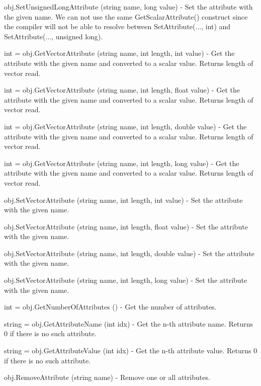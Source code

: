 \begin{DoxyItemize}
\item {\ttfamily obj.\-Set\-Unsigned\-Long\-Attribute (string name, long value)} -\/ Set the attribute with the given name. We can not use the same Get\-Scalar\-Attribute() construct since the compiler will not be able to resolve between Set\-Attribute(..., int) and Set\-Attribute(..., unsigned long).  
\item {\ttfamily int = obj.\-Get\-Vector\-Attribute (string name, int length, int value)} -\/ Get the attribute with the given name and converted to a scalar value. Returns length of vector read.  
\item {\ttfamily int = obj.\-Get\-Vector\-Attribute (string name, int length, float value)} -\/ Get the attribute with the given name and converted to a scalar value. Returns length of vector read.  
\item {\ttfamily int = obj.\-Get\-Vector\-Attribute (string name, int length, double value)} -\/ Get the attribute with the given name and converted to a scalar value. Returns length of vector read.  
\item {\ttfamily int = obj.\-Get\-Vector\-Attribute (string name, int length, long value)} -\/ Get the attribute with the given name and converted to a scalar value. Returns length of vector read.  
\item {\ttfamily obj.\-Set\-Vector\-Attribute (string name, int length, int value)} -\/ Set the attribute with the given name.  
\item {\ttfamily obj.\-Set\-Vector\-Attribute (string name, int length, float value)} -\/ Set the attribute with the given name.  
\item {\ttfamily obj.\-Set\-Vector\-Attribute (string name, int length, double value)} -\/ Set the attribute with the given name.  
\item {\ttfamily obj.\-Set\-Vector\-Attribute (string name, int length, long value)} -\/ Set the attribute with the given name.  
\item {\ttfamily int = obj.\-Get\-Number\-Of\-Attributes ()} -\/ Get the number of attributes.  
\item {\ttfamily string = obj.\-Get\-Attribute\-Name (int idx)} -\/ Get the n-\/th attribute name. Returns 0 if there is no such attribute.  
\item {\ttfamily string = obj.\-Get\-Attribute\-Value (int idx)} -\/ Get the n-\/th attribute value. Returns 0 if there is no such attribute.  
\item {\ttfamily obj.\-Remove\-Attribute (string name)} -\/ Remove one or all attributes.  

\end{DoxyItemize}

